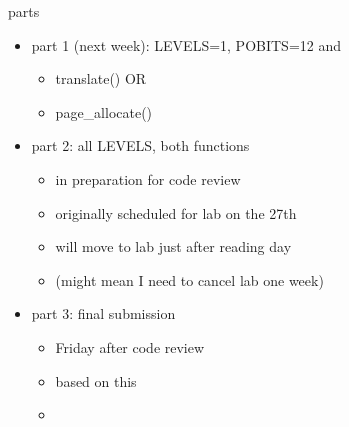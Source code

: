 \begin{frame}{parts}
    \begin{itemize}
    \item part 1 (next week): LEVELS=1, POBITS=12 and
        \begin{itemize}
        \item translate() OR
        \item page\_allocate()
        \end{itemize}
    \item part 2: all LEVELS, both functions
        \begin{itemize}
        \item in preparation for code review
        \item originally scheduled for lab on the 27th
        \item will move to lab just after reading day
        \item (might mean I need to cancel lab one week)
        \end{itemize}
    \item part 3: final submission
        \begin{itemize}
        \item Friday after code review
        \item {} based on this
        \item {}
        \end{itemize}
    \end{itemize}
\end{frame}
